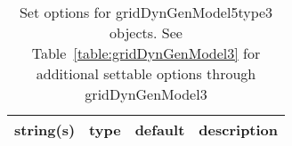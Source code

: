 \begin{table}[ht]
\centering
\begin{tabular}{p{5cm} c c p{7cm}}
\hline
string(s) & type & default & description \\
\hline
\hline
\end{tabular}
\caption{Set options for gridDynGenModel5type3 objects. See Table~\ref{table:gridDynGenModel3} for additional settable options through gridDynGenModel3}
\label{table:gridDynGenModel5type3}
\end{table}

